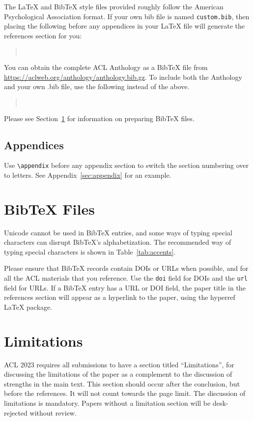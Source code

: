 \documentclass[11pt]{article}
\begin{document}
The \LaTeX{} and Bib\TeX{} style files provided roughly follow the American Psychological Association format.
If your own bib file is named \texttt{custom.bib}, then placing the following before any appendices in your \LaTeX{} file will generate the references section for you:
\begin{quote}
\begin{verbatim}


\end{verbatim}
\end{quote}
You can obtain the complete ACL Anthology as a Bib\TeX{} file from \url{https://aclweb.org/anthology/anthology.bib.gz}.
To include both the Anthology and your own .bib file, use the following instead of the above.
\begin{quote}
\begin{verbatim}


\end{verbatim}
\end{quote}
Please see Section~\ref{sec:bibtex} for information on preparing Bib\TeX{} files.

\subsection{Appendices}

Use \verb|\appendix| before any appendix section to switch the section numbering over to letters. See Appendix~\ref{sec:appendix} for an example.

\section{Bib\TeX{} Files}
\label{sec:bibtex}

Unicode cannot be used in Bib\TeX{} entries, and some ways of typing special characters can disrupt Bib\TeX's alphabetization. The recommended way of typing special characters is shown in Table~\ref{tab:accents}.

Please ensure that Bib\TeX{} records contain DOIs or URLs when possible, and for all the ACL materials that you reference.
Use the \verb|doi| field for DOIs and the \verb|url| field for URLs.
If a Bib\TeX{} entry has a URL or DOI field, the paper title in the references section will appear as a hyperlink to the paper, using the hyperref \LaTeX{} package.

\section*{Limitations}
ACL 2023 requires all submissions to have a section titled ``Limitations'', for discussing the limitations of the paper as a complement to the discussion of strengths in the main text. This section should occur after the conclusion, but before the references. It will not count towards the page limit.
The discussion of limitations is mandatory. Papers without a limitation section will be desk-rejected without review.
\end{document}
